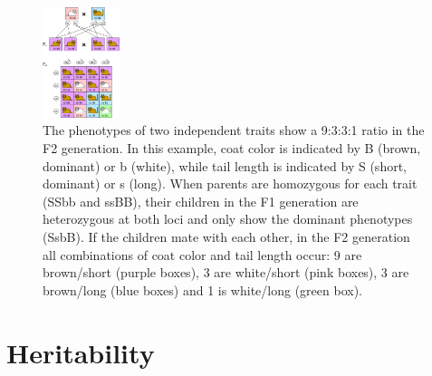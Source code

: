 \documentclass[a4paper]{article}
\begin{document}
\begin{figure}[htb]
\centering
\includegraphics[width=0.2\textwidth,height=0.3\textwidth]{./images/mendel2.png}
\caption{\label{fig:Mendel2}The phenotypes of two independent traits show a 9:3:3:1 ratio in the F2 generation. In this example, coat color is indicated by B (brown, dominant) or b (white), while tail length is indicated by S (short, dominant) or s (long). When parents are homozygous for each trait (SSbb and ssBB), their children in the F1 generation are heterozygous at both loci and only show the dominant phenotypes (SsbB). If the children mate with each other, in the F2 generation all combinations of coat color and tail length occur: 9 are brown/short (purple boxes), 3 are white/short (pink boxes), 3 are brown/long (blue boxes) and 1 is white/long (green box).}
\end{figure}

\section{Heritability}
\label{sec-26}
\end{document}
